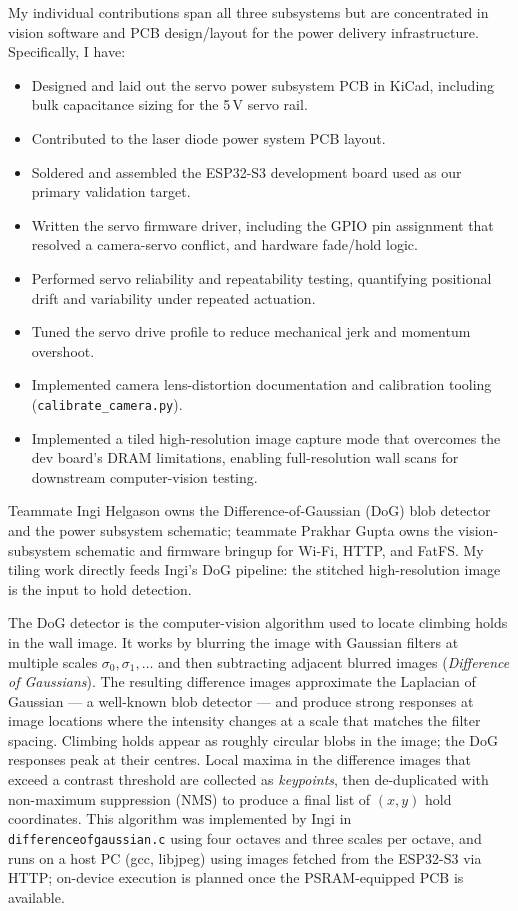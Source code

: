 \documentclass[12pt]{article}
\begin{document}
My individual contributions span all three subsystems but are concentrated in
vision software and PCB design/layout for the power delivery infrastructure.
Specifically, I have:

\begin{itemize}
  \item Designed and laid out the servo power subsystem PCB in KiCad,
        including bulk capacitance sizing for the 5\,V servo rail.
  \item Contributed to the laser diode power system PCB layout.
  \item Soldered and assembled the ESP32-S3 development board used as our
        primary validation target.
  \item Written the servo firmware driver, including the GPIO pin assignment
        that resolved a camera-servo conflict, and hardware fade/hold logic.
  \item Performed servo reliability and repeatability testing, quantifying
        positional drift and variability under repeated actuation.
  \item Tuned the servo drive profile to reduce mechanical jerk and
        momentum overshoot.
  \item Implemented camera lens-distortion documentation and calibration
        tooling (\texttt{calibrate\_camera.py}).
  \item Implemented a tiled high-resolution image capture mode that
        overcomes the dev board's DRAM limitations, enabling full-resolution
        wall scans for downstream computer-vision testing.
\end{itemize}

Teammate Ingi Helgason owns the Difference-of-Gaussian (DoG) blob detector and
the power subsystem schematic; teammate Prakhar Gupta owns the vision-subsystem
schematic and firmware bringup for Wi-Fi, HTTP, and FatFS.  My tiling work
directly feeds Ingi's DoG pipeline: the stitched high-resolution image is the
input to hold detection.

The DoG detector is the computer-vision algorithm used to locate climbing holds
in the wall image.  It works by blurring the image with Gaussian filters at
multiple scales $\sigma_0, \sigma_1, \ldots$ and then subtracting adjacent
blurred images (\emph{Difference of Gaussians}).  The resulting difference images
approximate the Laplacian of Gaussian --- a well-known blob detector --- and
produce strong responses at image locations where the intensity changes at a
scale that matches the filter spacing.  Climbing holds appear as roughly circular
blobs in the image; the DoG responses peak at their centres.  Local maxima in
the difference images that exceed a contrast threshold are collected as
\emph{keypoints}, then de-duplicated with non-maximum suppression (NMS) to
produce a final list of $(x, y)$ hold coordinates.  This algorithm was
implemented by Ingi in \texttt{differenceofgaussian.c} using four octaves and
three scales per octave, and runs on a host PC (gcc, libjpeg) using
images fetched from the ESP32-S3 via HTTP; on-device execution is planned
once the PSRAM-equipped PCB is available.
\end{document}
